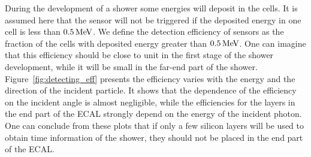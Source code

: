 During the development of a shower some energies will deposit in the cells.
It is assumed here that the sensor will not be triggered if the deposited energy in one cell is less than $0.5\text{\,Me\kern -0.1em V}$. We define the detection efficiency of sensors as the fraction of the cells with deposited energy greater than $0.5\text{\,Me\kern -0.1em V}$.
One can imagine that this efficiency should be close to unit in the first stage of the shower development, while it will be small in the far-end part of the shower.
Figure~\ref{fig:detecting_eff} presents the efficiency varies with the energy and the direction of the incident particle.
It shows that the dependence of the efficiency on the incident angle is almost negligible, 
while the efficiencies for the layers in the end part of the ECAL strongly depend on the energy of the incident photon. 
One can conclude from these plots that if only a few silicon layers will be used to obtain time information of the shower, they should not be placed in the end part of the ECAL.


